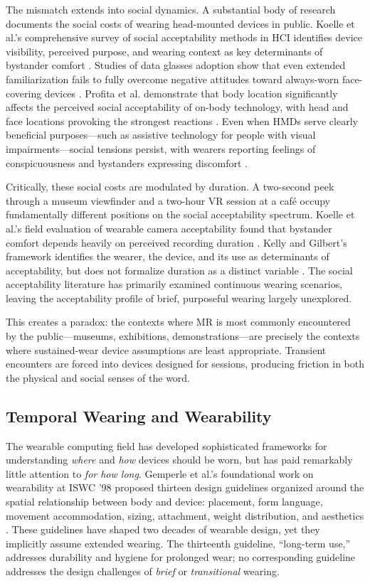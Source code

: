 The mismatch extends into social dynamics. A substantial body of research documents the social costs of wearing head-mounted devices in public. Koelle et al.'s comprehensive survey of social acceptability methods in HCI identifies device visibility, perceived purpose, and wearing context as key determinants of bystander comfort \cite{koelle2020social}. Studies of data glasses adoption show that even extended familiarization fails to fully overcome negative attitudes toward always-worn face-covering devices \cite{koelle2017acceptability}. Profita et al. demonstrate that body location significantly affects the perceived social acceptability of on-body technology, with head and face locations provoking the strongest reactions \cite{profita2013wrist}. Even when HMDs serve clearly beneficial purposes---such as assistive technology for people with visual impairments---social tensions persist, with wearers reporting feelings of conspicuousness and bystanders expressing discomfort \cite{profita2016at, goodman2019social}.

Critically, these social costs are modulated by duration. A two-second peek through a museum viewfinder and a two-hour VR session at a caf\'{e} occupy fundamentally different positions on the social acceptability spectrum. Koelle et al.'s field evaluation of wearable camera acceptability found that bystander comfort depends heavily on perceived recording duration \cite{koelle2019camera}. Kelly and Gilbert's framework identifies the wearer, the device, and its use as determinants of acceptability, but does not formalize duration as a distinct variable \cite{kelly2018wearer}. The social acceptability literature has primarily examined continuous wearing scenarios, leaving the acceptability profile of brief, purposeful wearing largely unexplored.

This creates a paradox: the contexts where MR is most commonly encountered by the public---museums, exhibitions, demonstrations---are precisely the contexts where sustained-wear device assumptions are least appropriate. Transient encounters are forced into devices designed for sessions, producing friction in both the physical and social senses of the word.

\subsection{Temporal Wearing and Wearability}

The wearable computing field has developed sophisticated frameworks for understanding \textit{where} and \textit{how} devices should be worn, but has paid remarkably little attention to \textit{for how long}. Gemperle et al.'s foundational work on wearability at ISWC '98 proposed thirteen design guidelines organized around the spatial relationship between body and device: placement, form language, movement accommodation, sizing, attachment, weight distribution, and aesthetics \cite{gemperle1998wearability}. These guidelines have shaped two decades of wearable design, yet they implicitly assume extended wearing. The thirteenth guideline, ``long-term use,'' addresses durability and hygiene for prolonged wear; no corresponding guideline addresses the design challenges of \textit{brief} or \textit{transitional} wearing.

